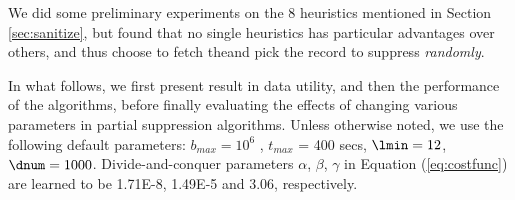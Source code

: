 
We did some preliminary experiments on the 8 heuristics mentioned in Section
\ref{sec:sanitize}, but found that no single heuristics has
particular advantages over others, and thus choose to fetch
the\qid and pick the record to suppress {\em randomly}.

In what follows, we first present result in data utility, and then
the performance of the algorithms, before finally evaluating the
effects of changing various parameters in partial suppression algorithms.
Unless otherwise noted, we use the following default parameters:
$b_{max} = 10^6$ , $t_{max}$ = 400 secs,
 $\lmin=12$, $\dnum = 1000$. Divide-and-conquer parameters
 $\alpha$, $\beta$, $\gamma$ in Equation (\ref{eq:costfunc}) are learned to
be 1.71E-8, 1.49E-5 and 3.06, respectively.


%

